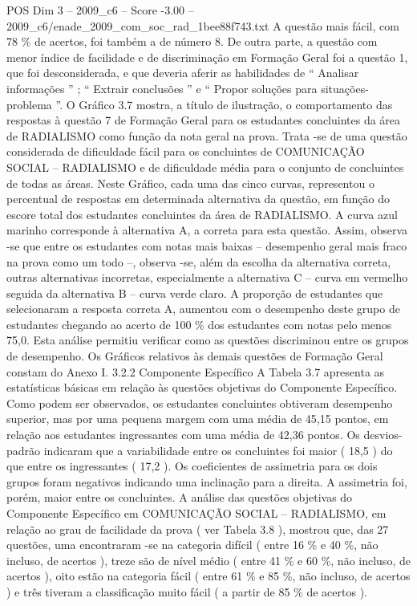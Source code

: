 \begin{textsample}{POS Dim 3 – 2009\_c6 – Score -3.00 – 2009\_c6/enade\_2009\_com\_soc\_rad\_1bee88f743.txt}
A questão mais fácil, com 78 \% de acertos, foi também a de número 8.
De outra parte, a questão com menor índice de facilidade e de discriminação em Formação Geral foi a questão 1, que foi desconsiderada, e que deveria aferir as habilidades de “ Analisar informações ” ; “ Extrair conclusões ” e “ Propor soluções para situações-problema ”.
O Gráfico 3.7 mostra, a título de ilustração, o comportamento das respostas à questão 7 de Formação Geral para os estudantes concluintes da área de RADIALISMO como função da nota geral na prova.
Trata -se de uma questão considerada de dificuldade fácil para os concluintes de COMUNICAÇÃO SOCIAL – RADIALISMO e de dificuldade média para o conjunto de concluintes de todas as áreas.
Neste Gráfico, cada uma das cinco curvas, representou o percentual de respostas em determinada alternativa da questão, em função do escore total dos estudantes concluintes da área de RADIALISMO.
A curva azul marinho corresponde à alternativa A, a correta para esta questão.
Assim, observa -se que entre os estudantes com notas mais baixas – desempenho geral mais fraco na prova como um todo –, observa -se, além da escolha da alternativa correta, outras alternativas incorretas, especialmente a alternativa C – curva em vermelho seguida da alternativa B – curva verde claro.
A proporção de estudantes que selecionaram a resposta correta A, aumentou com o desempenho deste grupo de estudantes chegando ao acerto de 100 \% dos estudantes com notas pelo menos 75,0.
Esta análise permitiu verificar como as questões discriminou entre os grupos de desempenho.
Os Gráficos relativos às demais questões de Formação Geral constam do Anexo I. 3.2.2 Componente Específico A Tabela 3.7 apresenta as estatísticas básicas em relação às questões objetivas do Componente Específico.
Como podem ser observados, os estudantes concluintes obtiveram desempenho superior, mas por uma pequena margem com uma média de 45,15 pontos, em relação aos estudantes ingressantes com uma média de 42,36 pontos.
Os desvios-padrão indicaram que a variabilidade entre os concluintes foi maior ( 18,5 ) do que entre os ingressantes ( 17,2 ).
Os coeficientes de assimetria para os dois grupos foram negativos indicando uma inclinação para a direita.
A assimetria foi, porém, maior entre os concluintes.
A análise das questões objetivas do Componente Específico em COMUNICAÇÃO SOCIAL – RADIALISMO, em relação ao grau de facilidade da prova ( ver Tabela 3.8 ), mostrou que, das 27 questões, uma encontraram -se na categoria difícil ( entre 16 \% e 40 \%, não incluso, de acertos ), treze são de nível médio ( entre 41 \% e 60 \%, não incluso, de acertos ), oito estão na categoria fácil ( entre 61 \% e 85 \%, não incluso, de acertos ) e três tiveram a classificação muito fácil ( a partir de 85 \% de acertos ).

\end{textsample}
